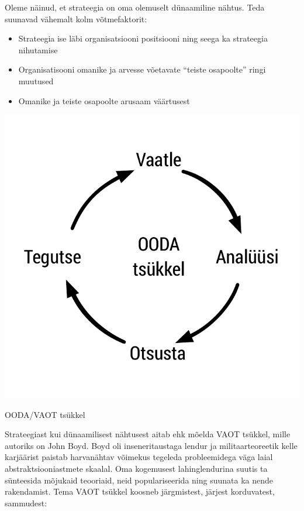 Oleme näinud, et strateegia on oma olemuselt dünaamiline nähtus. Teda suunavad vähemalt kolm võtmefaktorit:
\begin{itemize}
	\item Strateegia ise läbi organisatsiooni positsiooni ning seega ka strateegia nihutamise
	\item Organisatisooni omanike ja arvesse võetavate \enquote{teiste osapoolte} ringi muutused
	\item Omanike ja teiste osapoolte arusaam väärtusest
\end{itemize}
\begin{marginfigure}
	\begin{center}
		\includegraphics[width=\linewidth]{ooda.pdf}
		\caption{OODA/VAOT tsükkel}
		\label{fig:ooda}
	\end{center}
\end{marginfigure}

Strateegiast kui dünaamilisest nähtusest aitab ehk mõelda VAOT tsükkel, mille autoriks on John Boyd. Boyd oli inseneritaustaga lendur ja militaarteoreetik kelle karjäärist paistab harvanähtav võimekus tegeleda probleemidega väga laial abstraktsiooniastmete skaalal. Oma kogemusest lahinglendurina suutis ta sünteesida mõjukaid teooriaid, neid populariseerida ning suunata ka nende  rakendamist. Tema VAOT tsükkel koosneb järgmistest, järjest korduvatest, sammudest:

